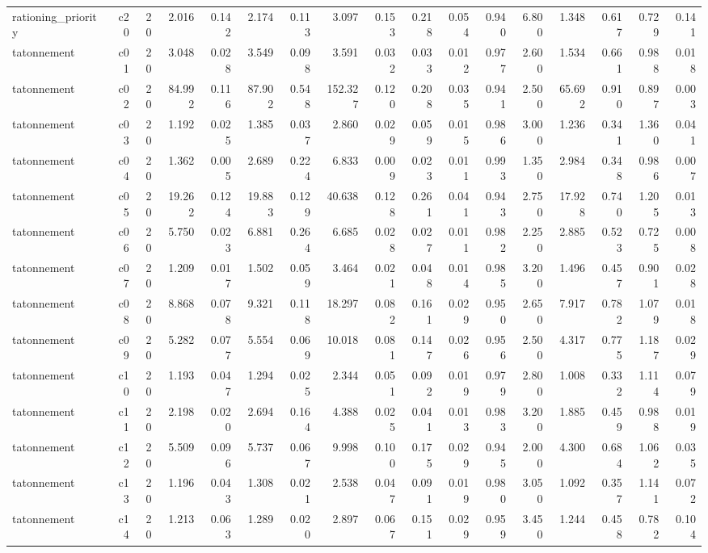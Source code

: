 \begin{table}[htbp]
\begin{tabular}{lrrrrrrrrrrrrrrrr}
rationing\_priority & c20 & 20 & 2.016 & 0.142 & 2.174 & 0.113 & 3.097 & 0.153 & 0.218 & 0.054 & 0.940 & 6.800 & 1.348 & 0.617 & 0.729 & 0.141 \\
tatonnement & c01 & 20 & 3.048 & 0.028 & 3.549 & 0.098 & 3.591 & 0.032 & 0.033 & 0.012 & 0.977 & 2.600 & 1.534 & 0.661 & 0.988 & 0.018 \\
tatonnement & c02 & 20 & 84.992 & 0.116 & 87.902 & 0.548 & 152.327 & 0.120 & 0.208 & 0.035 & 0.941 & 2.500 & 65.692 & 0.910 & 0.897 & 0.003 \\
tatonnement & c03 & 20 & 1.192 & 0.025 & 1.385 & 0.037 & 2.860 & 0.029 & 0.059 & 0.015 & 0.986 & 3.000 & 1.236 & 0.341 & 1.360 & 0.041 \\
tatonnement & c04 & 20 & 1.362 & 0.005 & 2.689 & 0.224 & 6.833 & 0.009 & 0.023 & 0.011 & 0.993 & 1.350 & 2.984 & 0.348 & 0.986 & 0.007 \\
tatonnement & c05 & 20 & 19.262 & 0.124 & 19.883 & 0.129 & 40.638 & 0.128 & 0.261 & 0.041 & 0.943 & 2.750 & 17.928 & 0.740 & 1.205 & 0.013 \\
tatonnement & c06 & 20 & 5.750 & 0.023 & 6.881 & 0.264 & 6.685 & 0.028 & 0.027 & 0.011 & 0.982 & 2.250 & 2.885 & 0.523 & 0.725 & 0.008 \\
tatonnement & c07 & 20 & 1.209 & 0.017 & 1.502 & 0.059 & 3.464 & 0.021 & 0.048 & 0.014 & 0.985 & 3.200 & 1.496 & 0.457 & 0.901 & 0.028 \\
tatonnement & c08 & 20 & 8.868 & 0.078 & 9.321 & 0.118 & 18.297 & 0.082 & 0.161 & 0.029 & 0.950 & 2.650 & 7.917 & 0.782 & 1.079 & 0.018 \\
tatonnement & c09 & 20 & 5.282 & 0.077 & 5.554 & 0.069 & 10.018 & 0.081 & 0.147 & 0.026 & 0.956 & 2.500 & 4.317 & 0.775 & 1.187 & 0.029 \\
tatonnement & c10 & 20 & 1.193 & 0.047 & 1.294 & 0.025 & 2.344 & 0.051 & 0.092 & 0.019 & 0.979 & 2.800 & 1.008 & 0.332 & 1.114 & 0.079 \\
tatonnement & c11 & 20 & 2.198 & 0.020 & 2.694 & 0.164 & 4.388 & 0.025 & 0.041 & 0.013 & 0.983 & 3.200 & 1.885 & 0.459 & 0.988 & 0.019 \\
tatonnement & c12 & 20 & 5.509 & 0.096 & 5.737 & 0.067 & 9.998 & 0.100 & 0.175 & 0.029 & 0.945 & 2.000 & 4.300 & 0.684 & 1.062 & 0.035 \\
tatonnement & c13 & 20 & 1.196 & 0.043 & 1.308 & 0.021 & 2.538 & 0.047 & 0.091 & 0.019 & 0.980 & 3.050 & 1.092 & 0.357 & 1.141 & 0.072 \\
tatonnement & c14 & 20 & 1.213 & 0.063 & 1.289 & 0.020 & 2.897 & 0.067 & 0.151 & 0.029 & 0.959 & 3.450 & 1.244 & 0.458 & 0.782 & 0.104 \\

\end{tabular}
\end{table}

